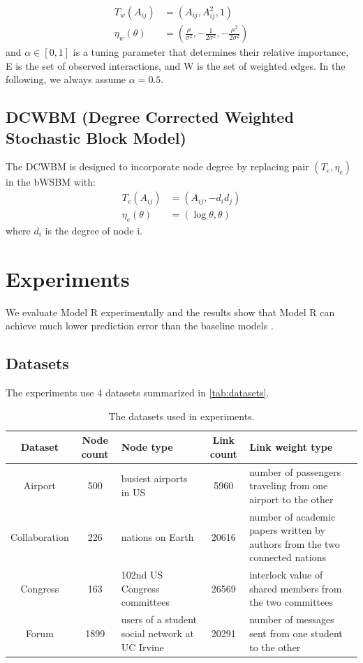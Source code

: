\documentclass[letterpaper]{article}
\begin{document}
\begin{align*}
T_w(A_{ij}) &= (A_{ij}, A_{ij}^2, 1)\\
\eta_w(\theta)
&= (\frac{\mu}{\sigma^2}, -\frac{1}{2\sigma^2}, -\frac{\mu^2}{2\sigma^2})
\end{align*}
and $ \alpha \in [0, 1]$ is a tuning parameter that determines their relative importance,
E is the set of observed interactions,
and W is the set of weighted edges.
In the following, we always assume $ \alpha = 0.5 $.

\subsection{DCWBM (Degree Corrected Weighted Stochastic Block Model)}
The DCWBM is designed to incorporate node degree
by replacing pair $ (T_e, \eta_e) $ in the bWSBM with:
\begin{align*}
	T_e(A_{ij}) &= (A_{ij}, -d_id_j)\\
	\eta_e(\theta) &= (\log\theta, \theta)
\end{align*}
where $ d_i $ is the degree of node i.

\section{Experiments}
We evaluate Model R experimentally
and the results show that 
Model R can achieve much lower prediction error than the baseline models \cite{aicher2014learning}.

\subsection{Datasets}
The experiments use 4 datasets summarized in \autoref{tab:datasets}.
\begin{table}[!htb]\centering
	\caption{The datasets used in experiments.}
	\begin{tabularx}{\textwidth}{|c|c|X|c|X|}  \hline \rowcolor{blue!50}
		Dataset & Node count & Node type & Link count & Link weight type \\ \hline
		Airport\cite{colizza2007reaction} & 500 & busiest airports in US & 5960 & number of passengers traveling from one airport to the other\\ \hline
		Collaboration\cite{pan2012world} & 226 & nations on Earth & 20616 & number of academic papers written by authors from the two connected nations \\ \hline
		Congress\cite{porter2005network} & 163  & 102nd US Congress committees & 26569 & interlock value of shared members from the two committees \\ \hline
		Forum\cite{opsahl2009clustering}  & 1899 & users of a student social network at UC Irvine & 20291 & number of messages sent from one student to the other \\ \hline
	\end{tabularx}
	\label{tab:datasets}
\end{table}
\end{document}
